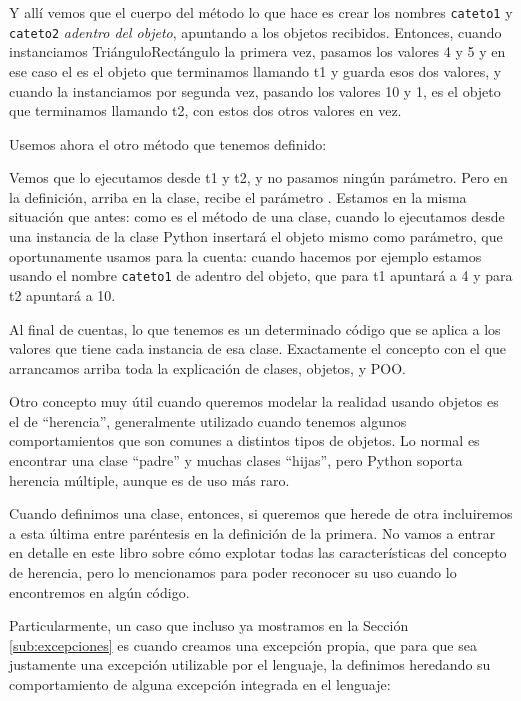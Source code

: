 Y allí vemos que el cuerpo del método  lo que hace es crear los nombres \verb|cateto1| y \verb|cateto2| \textit{adentro del objeto}, apuntando a los objetos recibidos. Entonces, cuando instanciamos TriánguloRectángulo la primera vez, pasamos los valores 4 y 5 y en ese caso el  es el objeto que terminamos llamando t1 y guarda esos dos valores, y cuando la instanciamos por segunda vez, pasando los valores 10 y 1,  es el objeto que terminamos llamando t2, con estos dos otros valores en vez.

Usemos ahora el otro método que tenemos definido:


Vemos que lo ejecutamos desde t1 y t2, y no pasamos ningún parámetro. Pero en la definición, arriba en la clase, recibe el parámetro . Estamos en la misma situación que antes: como es el método de una clase, cuando lo ejecutamos desde una instancia de la clase Python insertará el objeto mismo como parámetro, que oportunamente usamos para la cuenta: cuando hacemos por ejemplo  estamos usando el nombre \verb|cateto1| de adentro del objeto, que para t1 apuntará a 4 y para t2 apuntará a 10. 

Al final de cuentas, lo que tenemos es un determinado código que se aplica a los valores que tiene cada instancia de esa clase. Exactamente el concepto con el que arrancamos arriba toda la explicación de clases, objetos, y POO.

Otro concepto muy útil cuando queremos modelar la realidad usando objetos es el de ``herencia'', generalmente utilizado cuando tenemos algunos comportamientos que son comunes a distintos tipos de objetos. Lo normal es encontrar una clase ``padre'' y muchas clases ``hijas'', pero Python soporta herencia múltiple, aunque es de uso más raro.

Cuando definimos una clase, entonces, si queremos que herede de otra incluiremos a esta última entre paréntesis en la definición de la primera. No vamos a entrar en detalle en este libro sobre cómo explotar todas las características del concepto de herencia, pero lo mencionamos para poder reconocer su uso cuando lo encontremos en algún código.

Particularmente, un caso que incluso ya mostramos en la Sección \ref{sub:excepciones} es cuando creamos una excepción propia, que para que sea justamente una excepción utilizable por el lenguaje, la definimos heredando su comportamiento de alguna excepción integrada en el lenguaje:

